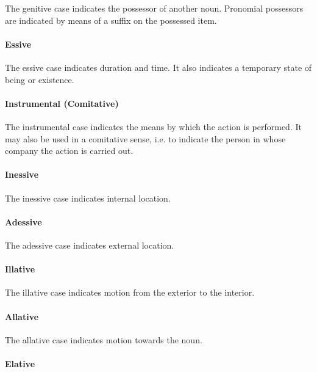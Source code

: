 \documentclass[grammar]{subfiles}
\begin{document}
  The genitive case indicates the possessor of another noun. Pronomial possessors are indicated by means of a suffix on the possessed item.

  \paragraph{Essive}
  \label{par:nm_essive_case}

  The essive case indicates duration and time. It also indicates a temporary state of being or existence.

  \paragraph{Instrumental (Comitative)}
  \label{par:nm_instrumental_case}

  The instrumental case indicates the means by which the action is performed. It may also be used in a comitative sense, i.e. to indicate the person in whose company the action is carried out.

  \paragraph{Inessive}
  \label{par:nm_inessive_case}

  The inessive case indicates internal location. 

  \paragraph{Adessive}
  \label{par:nm_adessive_case}

  The adessive case indicates external location.

  \paragraph{Illative}
  \label{par:nm_illative_case}

  The illative case indicates motion from the exterior to the interior.

  \paragraph{Allative}
  \label{par:nm_allative_case}

  The allative case indicates motion towards the noun.

  \paragraph{Elative}
  \label{par:nm_elative_case}
\end{document}
